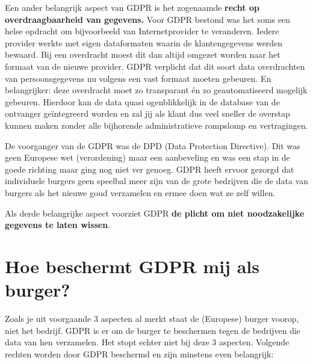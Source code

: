 \documentclass[
  10pt,
  dutch,
  paper=a4,
  ,captions=tableheading
]{scrbook}
\begin{document}
Een ander belangrijk aspect van GDPR is het zogenaamde \textbf{recht op
overdraagbaarheid van gegevens.} Voor GDPR bestond was het soms een
helse opdracht om bijvoorbeeld van Internetprovider te veranderen.
Iedere provider werkte met eigen dataformaten waarin de klantengegevens
werden bewaard. Bij een overdracht moest dit dan altijd omgezet worden
naar het formaat van de nieuwe provider. GDPR verplicht dat dit soort
data overdrachten van persoonsgegevens nu volgens een vast formaat
moeten gebeuren. En belangrijker: deze overdracht moet zo transparant én
zo geautomatiseerd mogelijk gebeuren. Hierdoor kan de data quasi
ogenblikkelijk in de database van de ontvanger geïntegreerd worden en
zal jij als klant dus veel sneller de overstap kunnen maken zonder alle
bijhorende administratieve rompslomp en vertragingen.

\begin{noteblock}
De voorganger van de GDPR was de DPD (Data Protection Directive). Dit
was geen Europese wet (verordening) maar een aanbeveling en was een stap
in de goede richting maar ging nog niet ver genoeg. GDPR heeft ervoor
gezorgd dat individuele burgers geen speelbal meer zijn van de grote
bedrijven die de data van burgers als het nieuwe goud verzamelen en
ermee doen wat ze zelf willen.
\end{noteblock}

Als derde belangrijke aspect voorziet GDPR \textbf{de plicht om niet
noodzakelijke gegevens te laten wissen}.

\section{Hoe beschermt GDPR mij als
burger?}\label{hoe-beschermt-gdpr-mij-als-burger}

Zoals je uit voorgaande 3 aspecten al merkt staat de (Europese) burger
voorop, niet het bedrijf. GDPR is er om de burger te beschermen tegen de
bedrijven die data van hen verzamelen. Het stopt echter niet bij deze 3
aspecten. Volgende rechten worden door GDPR beschermd en zijn minstens
even belangrijk:
\end{document}
